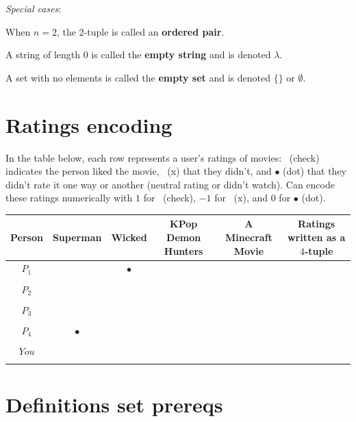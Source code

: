 \documentclass[12pt, oneside]{article}
\newcommand{\cmark}{\ding{51}}
\newcommand{\xmark}{\ding{55}}
\begin{document}
{\it Special cases}: 

When $n=2$, the 2-tuple is called an {\bf ordered pair}.

A string of length $0$ is called the {\bf empty string} and is denoted $\lambda$.

A set with no elements is called the {\bf empty set} and is denoted $\{\}$ or $\emptyset$. \vfill
\section*{Ratings encoding}


In the table  below,  each row represents a user's ratings of movies: 
\cmark~(check) indicates the person liked the movie, \xmark~(x)
that they didn't, and $\bullet$ (dot) that they didn't rate it one way or 
another (neutral rating or didn't watch). Can encode
these ratings numerically with $1$ for \cmark~(check), $-1$ for \xmark~(x), 
and $0$ for $\bullet$ (dot).

\vfill

\begin{center}
\begin{tabular}{c|cccc||c}
Person & Superman & Wicked & KPop Demon Hunters & A Minecraft Movie & Ratings written as a $4$-tuple\\
\hline
$P_1$     & \xmark & $\bullet$ & \cmark & \phantom{$(-1, 0, 1, 1)$} \\
&&&& \\
$P_2$     & \cmark & \cmark & \xmark & \phantom{$(1, 1, -1, 1)$} \\
&&&& \\
$P_3$     & \cmark & \cmark & \cmark & \phantom{$(1, 1, 1, 1)$} \\
&&&& \\
$P_4$     & $\bullet$ & \xmark & \cmark &  \\
&&&& \\
$You$     &  &  &  &  \\
&&&& \\
\end{tabular}
\end{center} \vfill
\section*{Definitions set prereqs}
\end{document}
